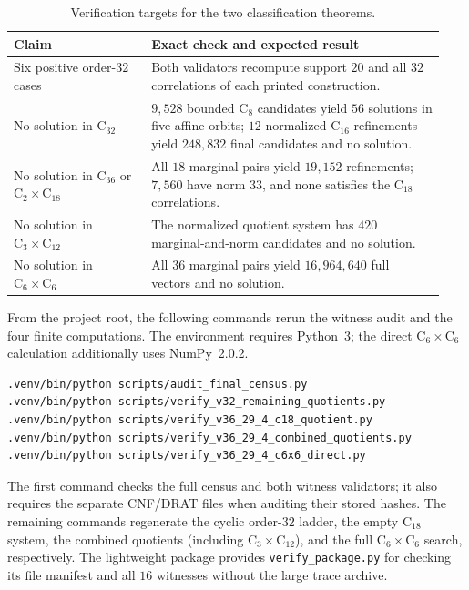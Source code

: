 \documentclass[11pt]{article}
\theoremstyle{remark}
\newcommand{\C}{\mathrm{C}}
\begin{document}
\begin{table}[ht]
\centering
\small
\caption{Verification targets for the two classification theorems.}
\label{tab:checks}
\begin{tabular}{@{}p{0.30\linewidth}p{0.64\linewidth}@{}}
\toprule
Claim & Exact check and expected result\\
\midrule
Six positive order-$32$ cases & Both validators recompute support $20$ and
all $32$ correlations of each printed construction.\\[3pt]
No solution in $\C_{32}$ & $9{,}528$ bounded $\C_8$ candidates yield $56$
solutions in five affine orbits; $12$ normalized $\C_{16}$ refinements
yield $248{,}832$ final candidates and no solution.\\[3pt]
No solution in $\C_{36}$ or $\C_2\times\C_{18}$ & All $18$ marginal pairs
yield $19{,}152$ refinements; $7{,}560$ have norm $33$, and none satisfies
the $\C_{18}$ correlations.\\[3pt]
No solution in $\C_3\times\C_{12}$ & The normalized quotient system has
$420$ marginal-and-norm candidates and no solution.\\[3pt]
No solution in $\C_6\times\C_6$ & All $36$ marginal pairs yield
$16{,}964{,}640$ full vectors and no solution.\\
\bottomrule
\end{tabular}
\end{table}

From the project root, the following commands rerun the witness audit and
the four finite computations.  The environment requires Python~3; the
direct $\C_6\times\C_6$ calculation additionally uses NumPy~2.0.2.
\begin{verbatim}
.venv/bin/python scripts/audit_final_census.py
.venv/bin/python scripts/verify_v32_remaining_quotients.py
.venv/bin/python scripts/verify_v36_29_4_c18_quotient.py
.venv/bin/python scripts/verify_v36_29_4_combined_quotients.py
.venv/bin/python scripts/verify_v36_29_4_c6x6_direct.py
\end{verbatim}
The first command checks the full census and both witness validators; it
also requires the separate CNF/DRAT files when auditing their stored hashes.
The remaining commands regenerate the cyclic order-$32$ ladder, the empty
$\C_{18}$ system, the combined quotients (including $\C_3\times\C_{12}$),
and the full $\C_6\times\C_6$ search, respectively.  The lightweight package
provides \texttt{verify\_package.py} for checking its file manifest and all
$16$ witnesses without the large trace archive.
\end{document}

